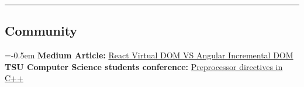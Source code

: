\documentclass[10pt,letterpaper]{article}
\begin{document}
\hrule
\vspace{-1.0em}
\subsection*{Community}
\begin{itemize}
  \parskip=-0.5em
  \vspace{0.05em}
  \newline \textbf {Medium Article:} \href {https://medium.com/@giorgi-dogadze/%E1%83%A0%E1%83%90-%E1%83%90%E1%83%A0%E1%83%98%E1%83%A1-react-virtual-dom-%E1%83%93%E1%83%90-angular-incremental-dom-dec1488d5393} {React Virtual DOM VS Angular Incremental DOM}
  \vspace{0.05em}
  \newline \textbf {TSU Computer Science students conference:} \href {https://computing.tsu.ge/ka/news/15} {Preprocessor directives in C++}
  
\end{itemize}
\end{document}

